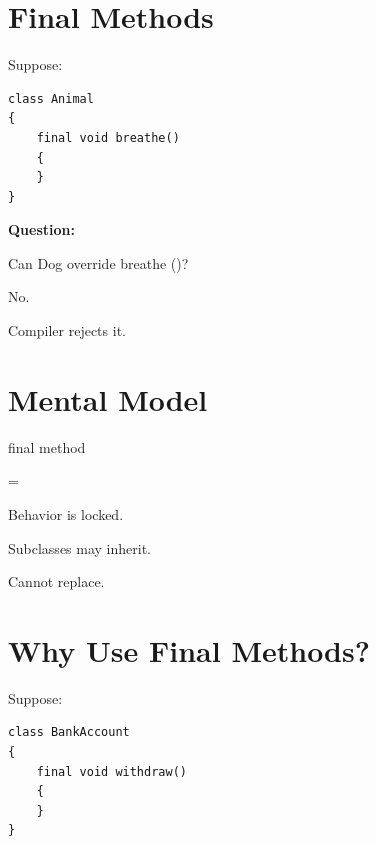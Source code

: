 \documentclass[11pt,a4paper]{book}
\begin{document}

\section{Final Methods}

Suppose:

\begin{verbatim}
class Animal
{
    final void breathe()
    {
    }
}
\end{verbatim}


\textbf{Question:}

Can Dog override breathe ()?


No.


Compiler rejects it.


\section{Mental Model}

\begin{mentalmodel}

final method

=

Behavior is locked.

\end{mentalmodel}


Subclasses may inherit.


Cannot replace.


\section{Why Use Final Methods?}

Suppose:

\begin{verbatim}
class BankAccount
{
    final void withdraw()
    {
    }
}
\end{verbatim}
\end{document}
